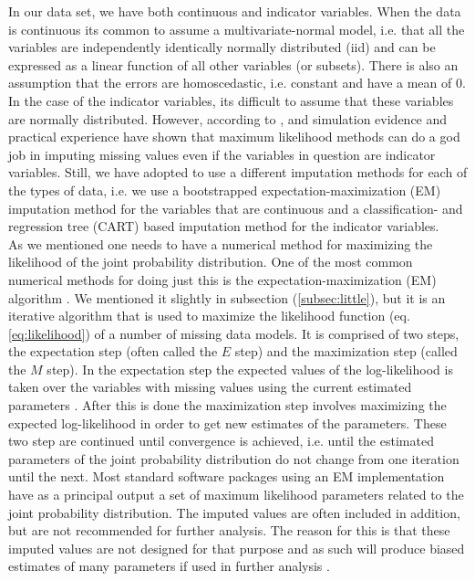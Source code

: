 \documentclass[../thesis.tex]{subfiles}
\begin{document}
\indent In our data set, we have both continuous and indicator variables. When the data is continuous its common to assume a multivariate-normal model, i.e. that all the variables are independently identically normally distributed (iid) and can be expressed as a linear function of all other variables (or subsets). There is also an assumption that the errors are homoscedastic, i.e. constant and have a mean of 0. In the case of the indicator variables, its difficult to assume that these variables are normally distributed. However, according to \cite{schafer1997analysis}, \cite{schafer1998multiple} and \cite{allison1999missing} simulation evidence and practical experience have shown that maximum likelihood methods can do a god job in imputing missing values even if the variables in question are indicator variables. Still, we have adopted to use a different imputation methods for each of the types of data, i.e. we use a bootstrapped expectation-maximization (EM) imputation method for the variables that are continuous and a classification- and regression tree (CART) based imputation method for the indicator variables.\\
\indent As we mentioned one needs to have a numerical method for maximizing the likelihood of the joint probability distribution. One of the most common numerical methods for doing just this is the expectation-maximization (EM) algorithm \citep{dempster1977maximum}. We mentioned it slightly in subsection (\ref{subsec:little}), but it is an iterative algorithm that is used to maximize the likelihood function (eq. \ref{eq:likelihood}) of a number of missing data models. It is comprised of two steps, the expectation step (often called the $E$ step) and the maximization step (called the $M$ step). In the expectation step the expected values of the log-likelihood is taken over the variables with missing values using the current estimated parameters \citep{allison1999missing}. After this is done the maximization step involves maximizing the expected log-likelihood in order to get new estimates of the parameters. These two step are continued until convergence is achieved, i.e. until the estimated parameters of the joint probability distribution do not change from one iteration until the next. Most standard software packages using an EM implementation have as a principal output a set of maximum likelihood parameters related to the joint probability distribution. The imputed values are often included in addition, but are not recommended for further analysis. The reason for this is that these imputed values are not designed for that purpose and as such will produce biased estimates of many parameters if used in further analysis \citep{allison1999missing}.\\
\end{document}
